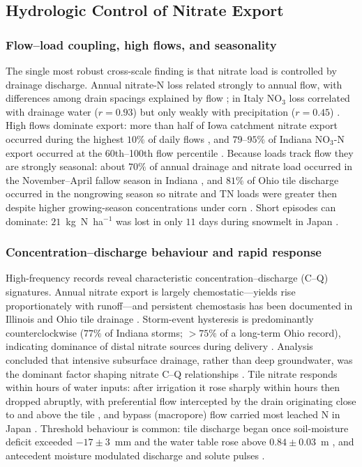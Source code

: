 \documentclass[11pt]{article}
\begin{document}
\subsection{Hydrologic Control of Nitrate Export}

\subsubsection{Flow--load coupling, high flows, and seasonality}

The single most robust cross-scale finding is that nitrate load is
controlled by drainage discharge. Annual nitrate-N loss related strongly to
annual flow, with differences among drain spacings explained by flow
\parencite{Kladivko2021,Bauwe2020}; in Italy NO$_3$ loss correlated with
drainage water ($r=0.93$) but only weakly with precipitation ($r=0.45$)
\parencite{ROSSI1991}. High flows dominate export: more than half of Iowa
catchment nitrate export occurred during the highest $10\%$ of daily flows
\parencite{Ikenberry2014}, and $79$--$95\%$ of Indiana NO$_3$-N export
occurred at the 60th--100th flow percentile \parencite{Speir2021}. Because
loads track flow they are strongly seasonal: about $70\%$ of annual drainage
and nitrate load occurred in the November--April fallow season in Indiana
\parencite{Kladivko2021,Kladivko2004}, and $81\%$ of Ohio tile discharge
occurred in the nongrowing season so nitrate and TN loads were greater then
despite higher growing-season concentrations under corn
\parencite{King2016}. Short episodes can dominate: $21$~kg~N~ha$^{-1}$ was
lost in only $11$ days during snowmelt in Japan \parencite{Hayashi1999}.

\subsubsection{Concentration--discharge behaviour and rapid response}

High-frequency records reveal characteristic concentration--discharge (C--Q)
signatures. Annual nitrate export is largely chemostatic---yields rise
proportionately with runoff---and persistent chemostasis has been documented
in Illinois and Ohio tile drainage
\parencite{Speir2021,Hu2024,Williams2015}. Storm-event hysteresis is
predominantly counterclockwise ($77\%$ of Indiana storms; $>75\%$ of a
long-term Ohio record), indicating dominance of distal nitrate sources
during delivery \parencite{Speir2021,Liu2022b}. Analysis concluded that
intensive subsurface drainage, rather than deep groundwater, was the
dominant factor shaping nitrate C--Q relationships
\parencite{Liu2022b}. Tile nitrate responds within hours of water inputs:
after irrigation it rose sharply within hours then dropped abruptly, with
preferential flow intercepted by the drain originating close to and above
the tile \parencite{Mohanty1998}, and bypass (macropore) flow carried most
leached N in Japan \parencite{Hayashi1999}. Threshold behaviour is common:
tile discharge began once soil-moisture deficit exceeded $-17\pm3$~mm and
the water table rose above $0.84\pm0.03$~m \parencite{Williams2022}, and
antecedent moisture modulated discharge and solute pulses
\parencite{Trentman2020,Kennedy2012}.
\end{document}
